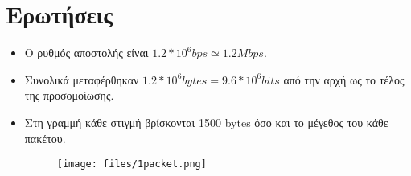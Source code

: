 \documentclass[a4paper,9pt]{article}
\begin{document}
\def\thesection {\Roman{section}.}


\section{Ερωτήσεις}
\begin{itemize}
    \item Ο ρυθμός αποστολής είναι $1.2*10^6 bps \simeq 1.2 Mbps$.
    \item Συνολικά μεταφέρθηκαν $1.2*10^6 bytes = 9.6*10^6 bits$ από την αρχή
        ως το τέλος της προσομοίωσης.
    \item Στη γραμμή κάθε στιγμή βρίσκονται 1500 bytes όσο και το μέγεθος του
        κάθε πακέτου.
        \begin{figure}[h]
            \centering
            \texttt{[image: files/1packet.png]}
        \end{figure}
\end{itemize}
\end{document}
